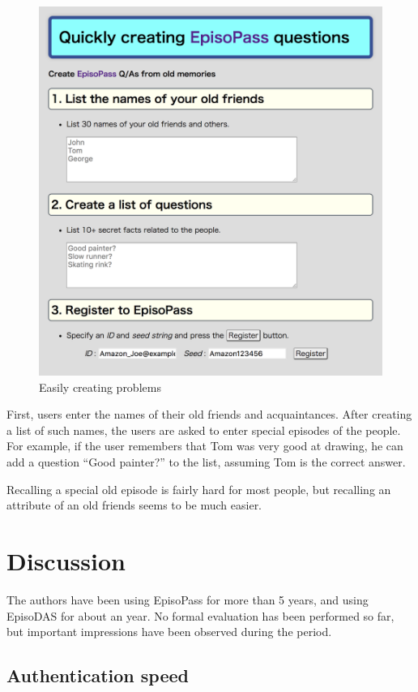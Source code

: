 \documentclass[sigconf]{acmart}
\begin{document}
\begin{figure}[H]
  \includegraphics[width=12cm,bb=0 0 1678 1728]{figures/Easy.png}
  \caption{Easily creating problems}
  \label{Easy}
\end{figure}

First, users enter the names of their old friends and acquaintances.
After creating a list of such names,
the users are asked to enter special episodes of the people.
For example, if the user remembers that Tom was
very good at drawing, he can add a question
``Good painter?'' to the list, assuming Tom is the correct answer.

Recalling a special old episode is fairly hard for most people, but
recalling an attribute of an old friends seems to be much easier.

\section{Discussion}

The authors have been using EpisoPass for more than 5 years, and
using EpisoDAS for about an year.
No formal evaluation has been performed so far, but
important impressions have been observed during the period.

\subsection{Authentication speed}
\end{document}
